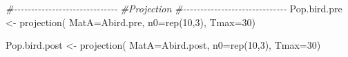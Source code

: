 \documentclass[
]{book}
\newenvironment{Shaded}{\begin{snugshade}}{\end{snugshade}}
\newcommand{\AttributeTok}[1]{\textcolor[rgb]{0.77,0.63,0.00}{#1}}
\newcommand{\CommentTok}[1]{\textcolor[rgb]{0.56,0.35,0.01}{\textit{#1}}}
\newcommand{\DecValTok}[1]{\textcolor[rgb]{0.00,0.00,0.81}{#1}}
\newcommand{\FunctionTok}[1]{\textcolor[rgb]{0.00,0.00,0.00}{#1}}
\newcommand{\NormalTok}[1]{#1}
\newcommand{\OtherTok}[1]{\textcolor[rgb]{0.56,0.35,0.01}{#1}}
\begin{document}
\begin{Shaded}
\begin{Highlighting}[]
\CommentTok{\#{-}{-}{-}{-}{-}{-}{-}{-}{-}{-}{-}{-}{-}{-}{-}{-}{-}{-}{-}{-}{-}{-}{-}{-}{-}{-}{-}{-}{-}{-}}
\CommentTok{\#Projection }
\CommentTok{\#{-}{-}{-}{-}{-}{-}{-}{-}{-}{-}{-}{-}{-}{-}{-}{-}{-}{-}{-}{-}{-}{-}{-}{-}{-}{-}{-}{-}{-}{-}}
\NormalTok{Pop.bird.pre }\OtherTok{\textless{}{-}} \FunctionTok{projection}\NormalTok{(}
  \AttributeTok{MatA=}\NormalTok{Abird.pre,}
  \AttributeTok{n0=}\FunctionTok{rep}\NormalTok{(}\DecValTok{10}\NormalTok{,}\DecValTok{3}\NormalTok{), }
  \AttributeTok{Tmax=}\DecValTok{30}\NormalTok{)}

\NormalTok{Pop.bird.post }\OtherTok{\textless{}{-}} \FunctionTok{projection}\NormalTok{(}
  \AttributeTok{MatA=}\NormalTok{Abird.post, }
  \AttributeTok{n0=}\FunctionTok{rep}\NormalTok{(}\DecValTok{10}\NormalTok{,}\DecValTok{3}\NormalTok{),}
  \AttributeTok{Tmax=}\DecValTok{30}\NormalTok{)}
\end{Highlighting}
\end{Shaded}


  
\end{document}
